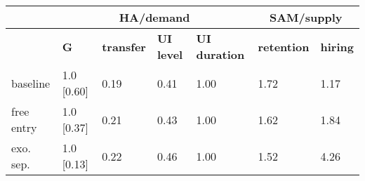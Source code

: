 \begin{tabular}{lllllll}
\multicolumn{1}{c}{}& \multicolumn{4}{c}{\textbf{HA/demand}} & \multicolumn{2}{c}{\textbf{SAM/supply}}\\
\toprule
 & \textbf{G} & \textbf{transfer}  & \textbf{UI level} & \textbf{UI duration} & \textbf{retention} & \textbf{hiring}\\
\midrule
baseline & 1.0 [0.60] & \color{gray} 0.19  & \color{gray}0.41 & \color{gray}1.00 & 1.72 & 1.17\\
free entry & 1.0 [0.37] & \color{gray}0.21  & \color{gray}0.43 & \color{gray}1.00 & 1.62 & 1.84\\
exo. sep. & 1.0 [0.13] & \color{gray}0.22  & \color{gray}0.46 & \color{gray}1.00 & 1.52 & 4.26\\
\bottomrule
\end{tabular}

